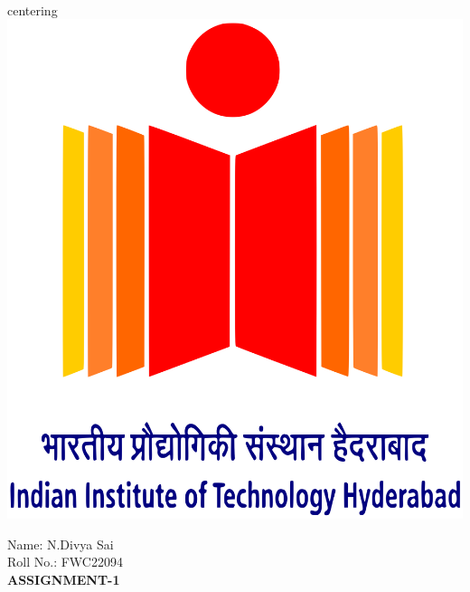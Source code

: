 \documentclass[10pt]{report}
\begin{document}
\\centering {\includegraphics[scale=0.05]{logo.png}} \vspace{3mm}\\ \raggedright Name: N.Divya Sai\hspace{12cm}\\
\raggedleft Roll No.: FWC22094
\\ \centering \Large \textbf{ASSIGNMENT-1}
\end{document}
